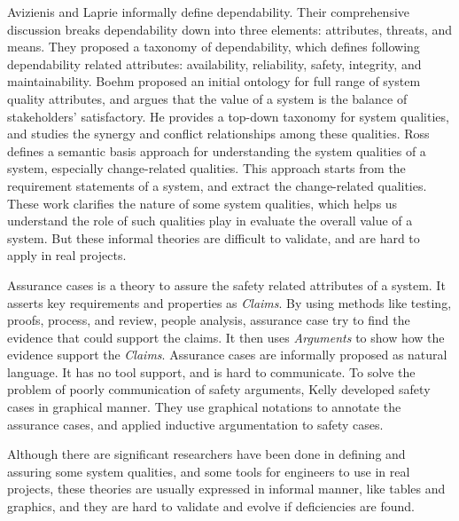 \documentclass[conference]{IEEEtran}
\begin{document}
Avizienis and Laprie \cite{Laprie:dependability} informally define dependability. Their comprehensive discussion breaks dependability down into three elements: attributes, threats, and means. They proposed a taxonomy of dependability, which defines following dependability related attributes: availability, reliability, safety, integrity, and maintainability. Boehm \cite{Boehm:ontology} proposed an initial ontology for full range of system quality attributes, and argues that the value of a system is the balance of stakeholders' satisfactory. He provides a top-down taxonomy for system qualities, and studies the synergy and conflict relationships among these qualities. Ross \cite{Ross:changeability} defines a semantic basis approach for understanding the system qualities of a system, especially change-related qualities. This approach starts from the requirement statements of a system, and extract the change-related qualities. These work clarifies the nature of some system qualities, which helps us understand the role of such qualities play in evaluate the overall value of a system. But these informal theories are difficult to validate, and are hard to apply in real projects.

Assurance cases is a theory to assure the safety related attributes of a system. It asserts key requirements and properties as {\em Claims}. By using methods like testing, proofs, process, and review, people analysis, assurance case try to find the evidence that could support the claims. It then uses {\em Arguments} to show how the evidence support the {\em Claims}. Assurance cases are informally proposed as natural language. It has no tool support, and is hard to communicate. To solve the problem of poorly communication of safety arguments, Kelly \cite{Kelly:GSN} developed safety cases in graphical manner. They use graphical notations to annotate the assurance cases, and applied inductive argumentation to safety cases. 

Although there are significant researchers have been done in defining and assuring some system qualities, and some tools for engineers to use in real projects, these theories are usually expressed in informal manner, like tables and graphics, and they are hard to validate and evolve if deficiencies are found.
\end{document}
